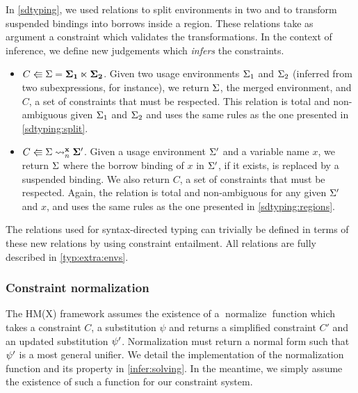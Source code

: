 In \cref{sdtyping}, we used relations to split environments in two and to
transform suspended bindings into borrows inside a region.
These relations take as argument a constraint which validates
the transformations.
In the context of inference, we define new judgements which \emph{infers}
the constraints.
\begin{itemize}[leftmargin=*]
\item $C \Lleftarrow \Sigma = \bf{\Sigma_1} \ltimes \bf{\Sigma_2}$.
  Given two usage environments $\Sigma_1$ and $\Sigma_2$
  (inferred from two subexpressions, for instance),
  we return $\Sigma$, the merged environment, and $C$, a set
  of constraints that must be respected.
  This relation is total and non-ambiguous given $\Sigma_1$ and $\Sigma_2$
  and uses the same rules as the one presented in \cref{sdtyping:split}.
\item $C \Lleftarrow \Sigma \rightsquigarrow_n^{\bf{x}} \bf\Sigma'$.
  Given a usage environment $\Sigma'$ and a variable name $x$, we return
  $\Sigma$ where the borrow binding of $x$ in $\Sigma'$, if it exists, is replaced by
  a suspended binding. We also return $C$, a set of constraints that must
  be respected.
  Again, the relation is total and non-ambiguous for any given $\Sigma'$ and $x$,
  and uses the same rules as the one presented in \cref{sdtyping:regions}.
\end{itemize}

The relations used for syntax-directed typing can trivially be defined
in terms of these new relations by using constraint entailment.
All relations are fully described in \cref{typ:extra:envs}.

\subsubsection{Constraint normalization}

The HM(X) framework assumes the existence of a $\operatorname{normalize}$
function which takes a constraint $C$, a substitution $\psi$ and returns a
simplified constraint $C'$
and an updated substitution $\mathrm{\psi}'$.
Normalization must return a normal form such that $\mathrm{\psi}'$ is a most general unifier.
We detail the implementation
of the normalization function and its property in \cref{infer:solving}.
In the meantime, we simply
assume the existence of such a function for our constraint system.

